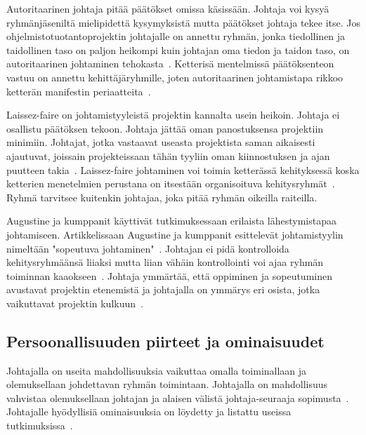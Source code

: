 \documentclass[finnish]{tktltiki2}
\theoremstyle{definition}
\theoremstyle{remark}
\begin{document}
Autoritaarinen johtaja pitää päätökset omissa käsissään. Johtaja voi kysyä ryhmänjäseniltä mielipidettä kysymyksistä mutta päätökset johtaja tekee itse. Jos ohjelmistotuotantoprojektin johtajalle on annettu ryhmän, jonka tiedollinen ja taidollinen taso on paljon heikompi kuin johtajan oma tiedon ja taidon taso, on autoritaarinen johtaminen tehokasta~\cite{Dhomne:2012:ITL:2382887.2382899}. Ketterisä mentelmissä päätöksenteon vastuu on annettu kehittäjäryhmille, joten autoritaarinen johtamistapa rikkoo ketterän manifestin periaatteita~\cite{fowler2001agile}.

Laissez-faire on johtamistyyleistä projektin kannalta usein heikoin. Johtaja ei osallistu päätöksen tekoon. Johtaja jättää oman panostuksensa projektiin minimiin. Johtajat, jotka vastaavat useasta projektista saman aikaisesti ajautuvat, joissain projekteissaan tähän tyyliin oman kiinnostuksen ja ajan puutteen takia~\cite{Dhomne:2012:ITL:2382887.2382899}. Laissez-faire johtaminen voi toimia ketterässä kehityksessä koska ketterien menetelmien perustana on itsestään organisoituva kehitysryhmät~\cite{fowler2001agile}. Ryhmä tarvitsee kuitenkin johtajaa, joka pitää ryhmän oikeilla raiteilla.

Augustine ja kumppanit käyttivät tutkimuksessaan erilaista lähestymistapaa johtamiseen. Artikkelissaan Augustine ja kumppanit esittelevät johtamistyylin nimeltään "sopeutuva johtaminen"~\cite{Augustine:2005:APM:1101779.1101781}. Johtajan ei pidä kontrolloida kehitysryhmäänsä liiaksi mutta liian vähäin kontrollointi voi ajaa ryhmän toiminnan kaaokseen~\cite{Augustine:2005:APM:1101779.1101781}. Johtaja ymmärtää, että oppiminen ja sopeutuminen avustavat projektin etenemistä ja johtajalla on ymmärys eri osista, jotka vaikuttavat projektin kulkuun~\cite{Augustine:2005:APM:1101779.1101781}. 





\subsection{Persoonallisuuden piirteet ja ominaisuudet}

Johtajalla on useita mahdollisuuksia vaikuttaa omalla toiminallaan ja olemuksellaan johdettavan ryhmän toimintaan. Johtajalla on mahdollisuus vahvistaa olemuksellaan johtajan ja alaisen välistä johtaja-seuraaja sopimusta~\cite{raccoon2006leadership}. Johtajalle hyödyllisiä ominaisuuksia on löydetty ja listattu useissa tutkimuksissa~\cite{raccoon2006leadership, Wang:2009:PMP:1639950.1640049}. 
\end{document}
